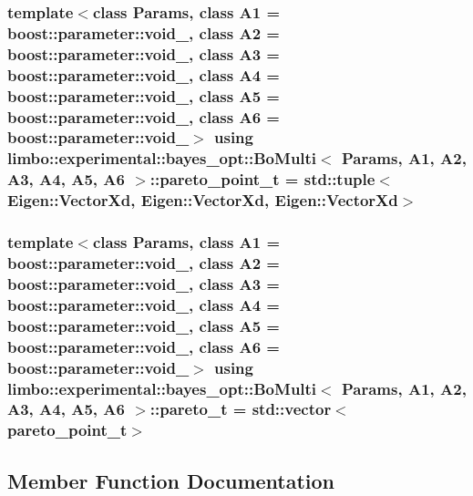\subsubsection[{\texorpdfstring{pareto\+\_\+point\+\_\+t}{pareto_point_t}}]{\setlength{\rightskip}{0pt plus 5cm}template$<$class Params, class A1 = boost\+::parameter\+::void\+\_\+, class A2 = boost\+::parameter\+::void\+\_\+, class A3 = boost\+::parameter\+::void\+\_\+, class A4 = boost\+::parameter\+::void\+\_\+, class A5 = boost\+::parameter\+::void\+\_\+, class A6 = boost\+::parameter\+::void\+\_\+$>$ using {\bf limbo\+::experimental\+::bayes\+\_\+opt\+::\+Bo\+Multi}$<$ Params, A1, A2, A3, A4, A5, A6 $>$\+::{\bf pareto\+\_\+point\+\_\+t} =  std\+::tuple$<$Eigen\+::\+Vector\+Xd, Eigen\+::\+Vector\+Xd, Eigen\+::\+Vector\+Xd$>$}\hypertarget{classlimbo_1_1experimental_1_1bayes__opt_1_1_bo_multi_a5592d2f8141fec88904c0f60beb7ff2d}{}\label{classlimbo_1_1experimental_1_1bayes__opt_1_1_bo_multi_a5592d2f8141fec88904c0f60beb7ff2d}
\subsubsection[{\texorpdfstring{pareto\+\_\+t}{pareto_t}}]{\setlength{\rightskip}{0pt plus 5cm}template$<$class Params, class A1 = boost\+::parameter\+::void\+\_\+, class A2 = boost\+::parameter\+::void\+\_\+, class A3 = boost\+::parameter\+::void\+\_\+, class A4 = boost\+::parameter\+::void\+\_\+, class A5 = boost\+::parameter\+::void\+\_\+, class A6 = boost\+::parameter\+::void\+\_\+$>$ using {\bf limbo\+::experimental\+::bayes\+\_\+opt\+::\+Bo\+Multi}$<$ Params, A1, A2, A3, A4, A5, A6 $>$\+::{\bf pareto\+\_\+t} =  std\+::vector$<${\bf pareto\+\_\+point\+\_\+t}$>$}\hypertarget{classlimbo_1_1experimental_1_1bayes__opt_1_1_bo_multi_aba7172aa379e749ea5cb85c8773e6408}{}\label{classlimbo_1_1experimental_1_1bayes__opt_1_1_bo_multi_aba7172aa379e749ea5cb85c8773e6408}


\subsection{Member Function Documentation}
